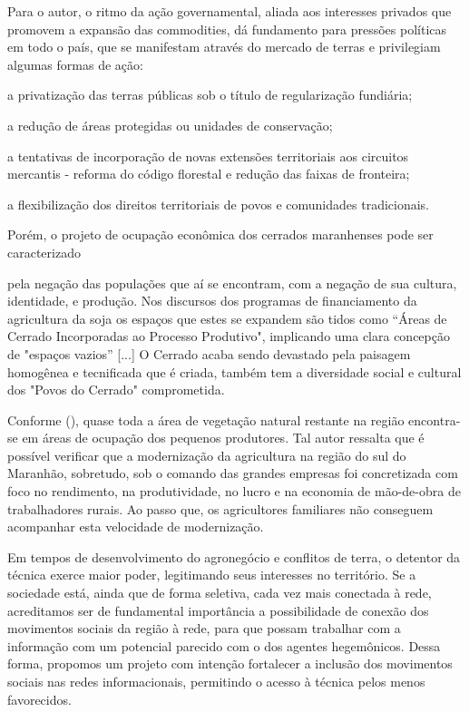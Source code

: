 Para o autor, o ritmo da ação governamental, aliada aos interesses privados que promovem a expansão das commodities, dá fundamento para pressões políticas em todo o país, que se manifestam através do mercado de terras e privilegiam algumas formas de ação:

\begin{alineas}
   \item a privatização das terras públicas sob o título de regularização fundiária;
   \item a redução de áreas protegidas ou unidades de conservação;
   \item a tentativas de incorporação de novas extensões territoriais aos circuitos mercantis - reforma do código florestal e redução das faixas de fronteira;
   \item a flexibilização dos direitos territoriais de povos e comunidades tradicionais.
\end{alineas}

Porém, o projeto de ocupação econômica dos cerrados maranhenses pode ser caracterizado

\begin{citacao}
pela negação das populações que aí se encontram, com a negação de sua cultura, identidade, e produção. Nos discursos dos programas de financiamento da agricultura da soja os espaços que estes se expandem são tidos como “Áreas de Cerrado Incorporadas ao Processo Produtivo", implicando uma clara concepção de "espaços vazios” [...] O Cerrado acaba sendo devastado pela paisagem homogênea e tecnificada que é criada,  também tem a diversidade social e cultural dos "Povos do Cerrado" comprometida. \cite[p. 13]{rodrigues_alencar}
\end{citacao}

Conforme  (\citeyear{studte2008}), quase toda a área de vegetação natural restante na região encontra-se em áreas de ocupação dos pequenos produtores.  Tal autor ressalta  que é possível verificar que a modernização  da  agricultura na  região do sul do Maranhão, sobretudo, sob o comando  das grandes empresas foi concretizada  com foco no rendimento,  na produtividade, no lucro e na economia de mão-de-obra de trabalhadores rurais.  Ao passo que, os agricultores familiares não conseguem acompanhar esta velocidade de modernização.

Em tempos de desenvolvimento do agronegócio e conflitos de terra, o detentor da técnica exerce maior poder, legitimando seus interesses no território. Se a sociedade está, ainda que de forma seletiva, cada vez mais conectada à rede, acreditamos ser de fundamental importância a possibilidade de conexão dos movimentos sociais da região à rede, para que possam trabalhar com a informação com um potencial parecido com o dos agentes hegemônicos. Dessa forma, propomos um projeto com intenção fortalecer a inclusão dos movimentos sociais nas redes informacionais, permitindo o acesso à técnica pelos menos favorecidos.

